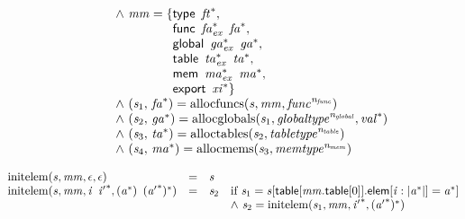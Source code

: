 $$\begin{array}{@{}lcl@{}l@{}}
 &&&\quad {\land}~{\mathit{mm}} = \{ \begin{array}[t]{@{}l@{}}
\mathsf{type}~\,{{\mathit{ft}}^\ast},\; \\
  \mathsf{func}~\,{{\mathit{fa}}_{{\mathit{ex}}}^\ast}~\,{{\mathit{fa}}^\ast},\; \\
  \mathsf{global}~\,{{\mathit{ga}}_{{\mathit{ex}}}^\ast}~\,{{\mathit{ga}}^\ast},\; \\
  \mathsf{table}~\,{{\mathit{ta}}_{{\mathit{ex}}}^\ast}~\,{{\mathit{ta}}^\ast},\; \\
  \mathsf{mem}~\,{{\mathit{ma}}_{{\mathit{ex}}}^\ast}~\,{{\mathit{ma}}^\ast},\; \\
  \mathsf{export}~\,{{\mathit{xi}}^\ast} \}\end{array} \\
 &&&\quad {\land}~({\mathit{s}}_{{1}},\, {{\mathit{fa}}^\ast}) = {\mathrm{allocfuncs}}({\mathit{s}}, {\mathit{mm}}, {{\mathit{func}}^{{\mathit{n}}_{{\mathit{func}}}}}) \\
 &&&\quad {\land}~({\mathit{s}}_{{2}},\, {{\mathit{ga}}^\ast}) = {\mathrm{allocglobals}}({\mathit{s}}_{{1}}, {{\mathit{globaltype}}^{{\mathit{n}}_{{\mathit{global}}}}}, {{\mathit{val}}^\ast}) \\
 &&&\quad {\land}~({\mathit{s}}_{{3}},\, {{\mathit{ta}}^\ast}) = {\mathrm{alloctables}}({\mathit{s}}_{{2}}, {{\mathit{tabletype}}^{{\mathit{n}}_{{\mathit{table}}}}}) \\
 &&&\quad {\land}~({\mathit{s}}_{{4}},\, {{\mathit{ma}}^\ast}) = {\mathrm{allocmems}}({\mathit{s}}_{{3}}, {{\mathit{memtype}}^{{\mathit{n}}_{{\mathit{mem}}}}}) \\
\end{array}
$$

\vspace{1ex}

$$
\begin{array}{@{}lcl@{}l@{}}
{\mathrm{initelem}}({\mathit{s}}, {\mathit{mm}}, \epsilon, \epsilon) &=& {\mathit{s}} &  \\
{\mathrm{initelem}}({\mathit{s}}, {\mathit{mm}}, {\mathit{i}}~\,{{\mathit{i}'}^\ast}, ({{\mathit{a}}^\ast})~\,{({{\mathit{a}'}^\ast})^\ast}) &=& {\mathit{s}}_{{2}} &\quad
  \mbox{if}~{\mathit{s}}_{{1}} = {\mathit{s}}{}[\mathsf{table}{}[{\mathit{mm}}.\mathsf{table}{}[0]].\mathsf{elem}{}[{\mathit{i}} : {|{{\mathit{a}}^\ast}|}] = {{\mathit{a}}^\ast}] \\
 &&&\quad {\land}~{\mathit{s}}_{{2}} = {\mathrm{initelem}}({\mathit{s}}_{{1}}, {\mathit{mm}}, {{\mathit{i}'}^\ast}, {({{\mathit{a}'}^\ast})^\ast}) \\
\end{array}
$$

